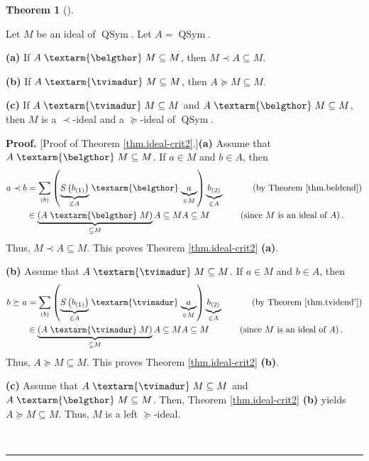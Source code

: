 \documentclass[numbers=enddot,12pt,final,onecolumn,notitlepage]{scrartcl}%
\theoremstyle{definition}
\newtheorem{theo}{Theorem}[section]
\newenvironment{theorem}[1][]
{\begin{theo}[#1]\begin{leftbar}}
{\end{leftbar}\end{theo}}
\newenvironment{proof}[1][Proof]{\noindent\textbf{#1.} }{\ \rule{0.5em}{0.5em}}
\newenvironment{verlong}{}{}
\newcommand{\tvi}{\left. \textarm{\tvimadur} \right.}
\newcommand{\bel}{\left. \textarm{\belgthor} \right.}
\let\sumnonlimits\sum
\renewcommand{\sum}{\sumnonlimits\limits}
\begin{document}
\begin{verlong}
\begin{theorem}
\label{thm.ideal-crit2}Let $M$ be an ideal of $\operatorname*{QSym}$. Let
$A=\operatorname*{QSym}$.

\textbf{(a)} If $A\bel  M\subseteq M$, then $M\left.  \prec\right.  A\subseteq
M$.

\textbf{(b)} If $A\tvi  M\subseteq M$, then $A\left.  \succeq\right.
M\subseteq M$.

\textbf{(c)} If $A\tvi  M\subseteq M$ and $A\bel  M\subseteq M$, then $M$ is a
$\left.  \prec\right.  $-ideal and a $\left.  \succeq\right.  $-ideal of
$\operatorname*{QSym}$.
\end{theorem}

\begin{proof}
[Proof of Theorem \ref{thm.ideal-crit2}.]\textbf{(a)} Assume that
$A\bel  M\subseteq M$. If $a\in M$ and $b\in A$, then%
\begin{align*}
a\left.  \prec\right.  b  &  =\sum_{\left(  b\right)  }\left(
\underbrace{S\left(  b_{\left(  1\right)  }\right)  }_{\in A}%
\bel \underbrace{a}_{\in M}\right)  \underbrace{b_{\left(  2\right)  }}_{\in
A}\ \ \ \ \ \ \ \ \ \ \left(  \text{by Theorem \ref{thm.beldend}}\right) \\
&  \in\underbrace{\left(  A\bel M\right)  }_{\subseteq M}A\subseteq
MA\subseteq M\ \ \ \ \ \ \ \ \ \ \left(  \text{since }M\text{ is an ideal of
}A\right)  .
\end{align*}
Thus, $M\left.  \prec\right.  A\subseteq M$. This proves Theorem
\ref{thm.ideal-crit2} \textbf{(a)}.

\textbf{(b)} Assume that $A\tvi  M\subseteq M$. If $a\in M$ and $b\in A$, then%
\begin{align*}
b\left.  \succeq\right.  a  &  =\sum_{\left(  b\right)  }\left(
\underbrace{S\left(  b_{\left(  1\right)  }\right)  }_{\in A}%
\tvi \underbrace{a}_{\in M}\right)  \underbrace{b_{\left(  2\right)  }}_{\in
A}\ \ \ \ \ \ \ \ \ \ \left(  \text{by Theorem \ref{thm.tvidend'}}\right) \\
&  \in\underbrace{\left(  A\tvi M\right)  }_{\subseteq M}A\subseteq
MA\subseteq M\ \ \ \ \ \ \ \ \ \ \left(  \text{since }M\text{ is an ideal of
}A\right)  .
\end{align*}
Thus, $A\left.  \succeq\right.  M\subseteq M$. This proves Theorem
\ref{thm.ideal-crit2} \textbf{(b)}.

\textbf{(c)} Assume that $A\tvi  M\subseteq M$ and $A\bel  M\subseteq M$.
Then, Theorem \ref{thm.ideal-crit2} \textbf{(b)} yields $A\left.
\succeq\right.  M\subseteq M$. Thus, $M$ is a left $\left.  \succeq\right.  $-ideal.


\end{proof}
\end{verlong}
\end{document}
